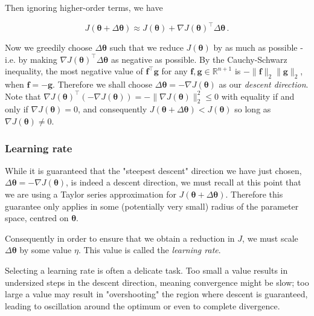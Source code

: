 \documentclass{article}[11pt]
\begin{document}
            Then ignoring higher-order terms, we have
            
            $$
            J(\boldsymbol{\theta} + \Delta \boldsymbol{\theta}) \approx J(\boldsymbol{\theta}) + \nabla J(\boldsymbol{\theta})^\top \Delta \boldsymbol{\theta} \,.
            $$
            
            Now we greedily choose $\Delta \boldsymbol{\theta}$ such that we reduce $J(\boldsymbol{\theta})$ by as much as possible - i.e. by making $\nabla J(\boldsymbol{\theta})^\top \Delta \boldsymbol{\theta}$ as negative as possible. By the Cauchy-Schwarz inequality, the most negative value of $\mathbf{f}^\top \mathbf{g}$ for any $\mathbf{f}, \mathbf{g} \in \mathbb{R}^{n+1}$ is $- \lVert \mathbf{f} \rVert_2 \lVert \mathbf{g} \rVert_2$, when $\mathbf{f} = -\mathbf{g}$. Therefore we shall choose $\Delta \boldsymbol{\theta} = - \nabla J(\boldsymbol{\theta})$ as our \textit{descent direction}. Note that $\nabla J(\boldsymbol{\theta})^\top (- \nabla J(\boldsymbol{\theta})) = -\lVert \nabla J(\boldsymbol{\theta}) \rVert_2^2 \leq 0$ with equality if and only if $\nabla J(\boldsymbol{\theta}) = 0$, and consequently $J(\boldsymbol{\theta} + \Delta \boldsymbol{\theta}) < J(\boldsymbol{\theta})$ so long as $\nabla J(\boldsymbol{\theta}) \neq 0$.
        
    
    
        \subsubsection{Learning rate}
            
            While it is guaranteed that the "steepest descent" direction we have just chosen, $\Delta \boldsymbol{\theta} = - \nabla J(\boldsymbol{\theta})$, is indeed a descent direction, we must recall at this point that we are using a Taylor series approximation for $J(\boldsymbol{\theta} + \Delta \boldsymbol{\theta})$. Therefore this guarantee only applies in some (potentially very small) radius of the parameter space, centred on $\boldsymbol{\theta}$.
            
            Consequently in order to ensure that we obtain a reduction in $J$, we must scale $\Delta \boldsymbol{\theta}$ by some value $\eta$. This value is called the \textit{learning rate}.
            
            Selecting a learning rate is often a delicate task. Too small a value results in undersized steps in the descent direction, meaning convergence might be slow; too large a value may result in "overshooting" the region where descent is guaranteed, leading to oscillation around the optimum or even to complete divergence.
            
\end{document}
